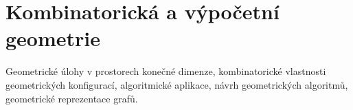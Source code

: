 \newpage
\section{Kombinatorická a výpočetní geometrie}
\begin{pozadavky}
\begin{pitemize}
\item Geometrické úlohy v prostorech konečné dimenze, kombinatorické vlastnosti geometrických konfigurací, algoritmické aplikace, návrh geometrických algoritmů, geometrické reprezentace grafů.
\end{pitemize}
\end{pozadavky}